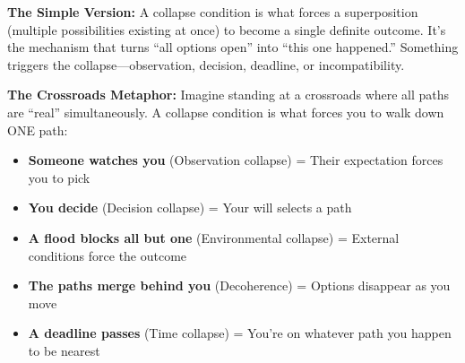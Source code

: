 \documentclass[11pt,twoside]{book}
\begin{document}
\begin{tcolorbox}[colback=green!5!white,colframe=green!65!black,title=\textbf{Plain English: What is a Collapse Condition?},breakable]

\textbf{The Simple Version:}
A collapse condition is what forces a superposition (multiple possibilities existing at once) to become a single definite outcome. It's the mechanism that turns ``all options open'' into ``this one happened.'' Something triggers the collapse---observation, decision, deadline, or incompatibility.

\textbf{The Crossroads Metaphor:}
Imagine standing at a crossroads where all paths are ``real'' simultaneously. A collapse condition is what forces you to walk down ONE path:

\begin{itemize}
    \item \textbf{Someone watches you} (Observation collapse) = Their expectation forces you to pick
    \item \textbf{You decide} (Decision collapse) = Your will selects a path
    \item \textbf{A flood blocks all but one} (Environmental collapse) = External conditions force the outcome
    \item \textbf{The paths merge behind you} (Decoherence) = Options disappear as you move
    \item \textbf{A deadline passes} (Time collapse) = You're on whatever path you happen to be nearest
\end{itemize}


\end{tcolorbox}
\end{document}
